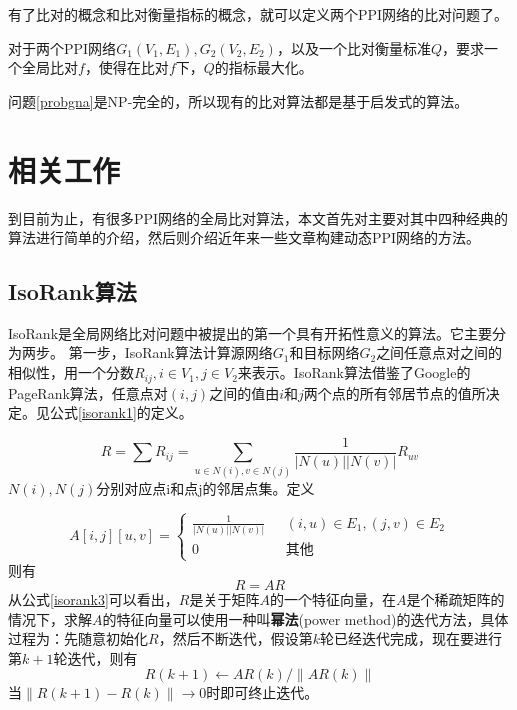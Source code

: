 有了比对的概念和比对衡量指标的概念，就可以定义两个PPI网络的比对问题了。

\begin{prob}[PPI网络比对问题]
\label{probgna}
对于两个PPI网络$G_1(V_1,E_1),G_2(V_2,E_2)$，以及一个比对衡量标准$Q$，要求一个全局比对$f$，使得在比对$f$下，$Q$的指标最大化。
\end{prob}

问题\ref{probgna}是NP-完全的，所以现有的比对算法都是基于启发式的算法。

\section{相关工作}
到目前为止，有很多PPI网络的全局比对算法，本文首先对主要对其中四种经典的算法进行简单的介绍，然后则介绍近年来一些文章构建动态PPI网络的方法。
\subsection{IsoRank算法}
IsoRank是全局网络比对问题中被提出的第一个具有开拓性意义的算法。它主要分为两步。
第一步，IsoRank算法计算源网络$G_1$和目标网络$G_2$之间任意点对之间的相似性，用一个分数$R_{ij},i\in V_1,j\in V_2$来表示。IsoRank算法借鉴了Google的PageRank算法，任意点对$(i,j)$之间的值由$i$和$j$两个点的所有邻居节点的值所决定。见公式\ref{isorank1}的定义。

\begin{equation}\label{isorank1}
R=\sum R_{ij}=\sum_{u\in N(i),v\in N(j)}\frac{1}{\left | N(u) \right |\left | N(v) \right |}R_{uv}
\end{equation}
$N(i),N(j)$分别对应点i和点j的邻居点集。定义

\begin{equation}\label{isorank2}
A[i,j][u,v]=\begin{cases}
\frac{1}{\left | N(u) \right |\left | N(v) \right |} & \text{  } (i,u)\in E_1, (j,v)\in E_2 \\ 
 0& \text{  } \text{其他}
\end{cases}
\end{equation}
则有
\begin{equation}\label{isorank3}
R=AR
\end{equation}
从公式\ref{isorank3}可以看出，$R$是关于矩阵$A$的一个特征向量，在$A$是个稀疏矩阵的情况下，求解$A$的特征向量可以使用一种叫\textbf{幂法}(power method)的迭代方法，具体过程为：先随意初始化$R$，然后不断迭代，假设第$k$轮已经迭代完成，现在要进行第$k+1$轮迭代，则有
\begin{equation}\label{isorank4}
R(k+1)\leftarrow AR(k)/\left \|AR(k)\right \|
\end{equation}
当$\left \|R(k+1)-R(k)\right \|\rightarrow 0$时即可终止迭代。

